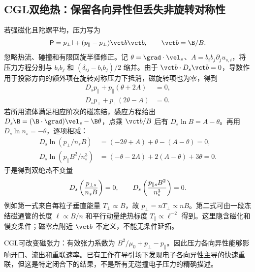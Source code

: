 \subsection{CGL双绝热：保留各向异性但丢失非旋转对称性}
若强磁化且陀螺平均，压力写为
\begin{equation}\mathsf P=p_\perp\mathsf I+(p_\parallel-p_\perp)\vct b\vct b,\qquad\vct b=\B/B.
\end{equation}
忽略热流、碰撞和有限回旋半径修正。记 $\theta=\grad\cdot\vel_s$、$A=b_ib_j\partial_ju_{s,i}$，将压力方程分别与 $b_ib_j$ 和 $(\delta_{ij}-b_ib_j)/2$ 缩并。由于 $\vct b\cdot D_s\vct b=0$，导数作用于投影方向的额外项在旋转对称压力下抵消，磁旋转项也为零，得到
\begin{align}
D_sp_\parallel+p_\parallel(\theta+2A)&=0,\\
D_sp_\perp+p_\perp(2\theta-A)&=0.
\end{align}
若所用流体满足相应阶次的磁冻结，感应方程给出
$D_s\B=(\B\cdot\grad)\vel_s-\B\theta$，点乘 $\vct b/B$ 后有
$D_s\ln B=A-\theta$。再用 $D_s\ln n_s=-\theta$，逐项相减：
\begin{align}
D_s\ln(p_\perp/n_sB)&=(-2\theta+A)+\theta-(A-\theta)=0,\\
D_s\ln(p_\parallel B^2/n_s^3)&=(-\theta-2A)+2(A-\theta)+3\theta=0.
\end{align}
于是得到双绝热不变量
\begin{equation}D_s\left({p_{\perp s}\over n_sB}\right)=0,\qquad
D_s\left({p_{\parallel s}B^2\over n_s^3}\right)=0.\label{eq:cgl}
\end{equation}
例如第一式来自每粒子垂直能量 $T_\perp\propto B$，故 $p_\perp=nT_\perp\propto nB$。第二式可由一段冻结磁通管的长度 $\ell\propto B/n$ 和平行动量绝热标度 $T_\parallel\propto\ell^{-2}$ 得到。这里隐含磁化和慢变条件；磁零点附近 $\vct b$ 不定义，不能无条件延拓。

CGL可改变磁张力：有效张力系数为 $B^2/\mu_0+p_\perp-p_\parallel$。因此压力各向异性能够影响开口、流出和重联速率。已有工作在导引场下发现电子各向异性主导的快速重联，但这是特定闭合下的结果，不是所有无碰撞电子压力的精确描述。\citep{Cassak2015}

